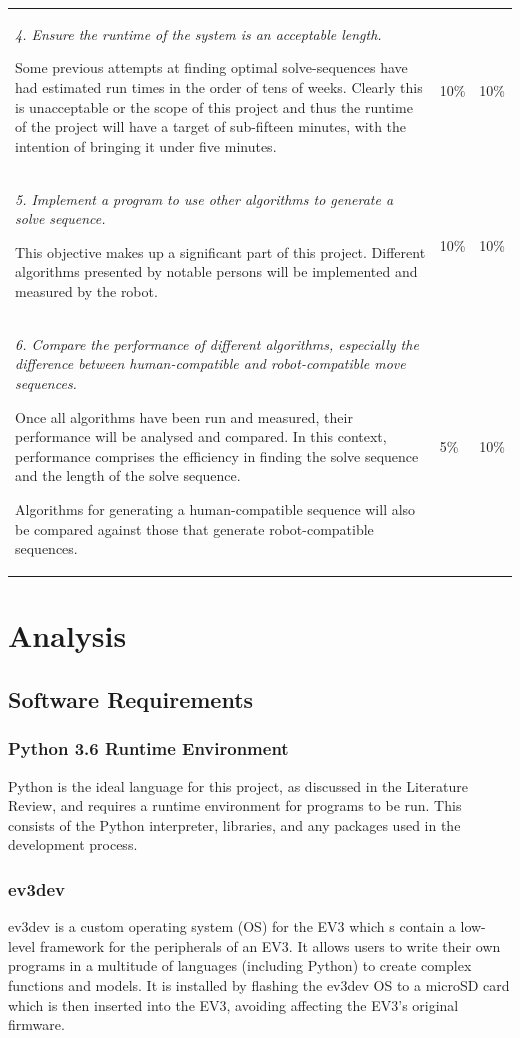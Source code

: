 \documentclass{report}
\begin{document}
\begin{longtable}[h]{m{}M{0.15\textwidth}M{0.15\textwidth}}
		\textit{4. Ensure the runtime of the system is an acceptable length.} \par Some previous attempts at finding optimal solve-sequences have had estimated run times in the order of tens of weeks. Clearly this is unacceptable or the scope of this project and thus the runtime of the project will have a target of sub-fifteen minutes, with the intention of bringing it under five minutes. & 10\% & 10\% \\
		\textit{5. Implement a program to use other algorithms to generate a solve sequence.} \par This objective makes up a significant part of this project. Different algorithms presented by notable persons will be implemented and measured by the robot. & 10\% & 10\% \\
		\textit{6. Compare the performance of different algorithms, especially the difference between human-compatible and robot-compatible move sequences.} \par Once all algorithms have been run and measured, their performance will be analysed and compared. In this context, performance comprises the efficiency in finding the solve sequence and the length of the solve sequence. \par Algorithms for generating a human-compatible sequence will also be compared against those that generate robot-compatible sequences. & 5\% & 10\% \\
    	\bottomrule
    \end{longtable}
    
    \section{Analysis}
    \subsection{Software Requirements}
    \subsubsection{Python 3.6 Runtime Environment}
    Python is the ideal language for this project, as discussed in the Literature Review, and requires a runtime environment for programs to be run. This consists of the Python interpreter, libraries, and any packages used in the development process.
    \subsubsection{ev3dev}
    ev3dev \cite{Ev3dev.org} is a custom operating system (OS) for the EV3 which s contain a low-level framework for the peripherals of an EV3. It allows users to write their own programs in a multitude of languages (including Python) to create complex functions and models. It is installed by flashing the ev3dev OS to a microSD card which is then inserted into the EV3, avoiding affecting the EV3’s original firmware.
    
\end{document}
